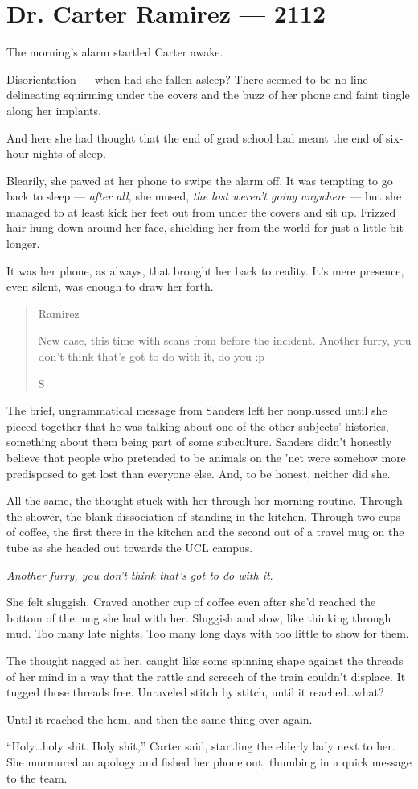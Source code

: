 \hypertarget{dr-carter-ramirez-2112}{%
\chapter*{Dr. Carter Ramirez — 2112}\label{dr-carter-ramirez-2112}}

The morning's alarm startled Carter awake.

Disorientation — when had she fallen asleep? There seemed to be no line delineating squirming under the covers and the buzz of her phone and faint tingle along her implants.

And here she had thought that the end of grad school had meant the end of six-hour nights of sleep.

Blearily, she pawed at her phone to swipe the alarm off. It was tempting to go back to sleep — \emph{after all,} she mused, \emph{the lost weren't going anywhere} — but she managed to at least kick her feet out from under the covers and sit up. Frizzed hair hung down around her face, shielding her from the world for just a little bit longer.

It was her phone, as always, that brought her back to reality. It's mere presence, even silent, was enough to draw her forth.

\begin{quote}
Ramirez

New case, this time with scans from before the incident. Another furry, you don't think that's got to do with it, do you :p

S
\end{quote}

The brief, ungrammatical message from Sanders left her nonplussed until she pieced together that he was talking about one of the other subjects' histories, something about them being part of some subculture. Sanders didn't honestly believe that people who pretended to be animals on the 'net were somehow more predisposed to get lost than everyone else. And, to be honest, neither did she.

All the same, the thought stuck with her through her morning routine. Through the shower, the blank dissociation of standing in the kitchen. Through two cups of coffee, the first there in the kitchen and the second out of a travel mug on the tube as she headed out towards the UCL campus.

\emph{Another furry, you don't think that's got to do with it}.

She felt sluggish. Craved another cup of coffee even after she'd reached the bottom of the mug she had with her. Sluggish and slow, like thinking through mud. Too many late nights. Too many long days with too little to show for them.

The thought nagged at her, caught like some spinning shape against the threads of her mind in a way that the rattle and screech of the train couldn't displace. It tugged those threads free. Unraveled stitch by stitch, until it reached\ldots{}what?

Until it reached the hem, and then the same thing over again.

``Holy\ldots{}holy shit. Holy shit,'' Carter said, startling the elderly lady next to her. She murmured an apology and fished her phone out, thumbing in a quick message to the team.
